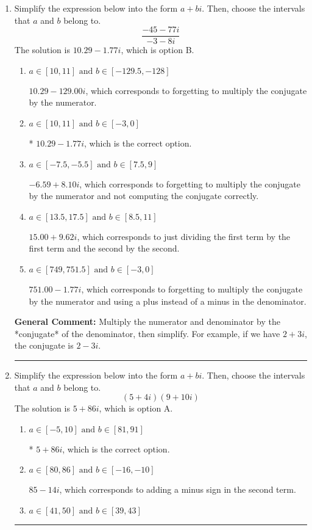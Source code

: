 \documentclass{extbook}[14pt]
\newcommand{\litem}[1]{\item #1

\rule{\textwidth}{0.4pt}}
\begin{document}
\begin{enumerate}
{ Irrational numbers are more than just square root of 3: adding or subtracting values from square root of 3 is also irrational.
}
\litem{
Simplify the expression below into the form $a+bi$. Then, choose the intervals that $a$ and $b$ belong to.
\[ \frac{-45 - 77 i}{-3 - 8 i} \]
The solution is \( 10.29  - 1.77 i \), which is option B.\begin{enumerate}[label=\Alph*.]
\item \( a \in [10, 11] \text{ and } b \in [-129.5, -128] \)

 $10.29  - 129.00 i$, which corresponds to forgetting to multiply the conjugate by the numerator.
\item \( a \in [10, 11] \text{ and } b \in [-3, 0] \)

* $10.29  - 1.77 i$, which is the correct option.
\item \( a \in [-7.5, -5.5] \text{ and } b \in [7.5, 9] \)

 $-6.59  + 8.10 i$, which corresponds to forgetting to multiply the conjugate by the numerator and not computing the conjugate correctly.
\item \( a \in [13.5, 17.5] \text{ and } b \in [8.5, 11] \)

 $15.00  + 9.62 i$, which corresponds to just dividing the first term by the first term and the second by the second.
\item \( a \in [749, 751.5] \text{ and } b \in [-3, 0] \)

 $751.00  - 1.77 i$, which corresponds to forgetting to multiply the conjugate by the numerator and using a plus instead of a minus in the denominator.
\end{enumerate}

\textbf{General Comment:} Multiply the numerator and denominator by the *conjugate* of the denominator, then simplify. For example, if we have $2+3i$, the conjugate is $2-3i$.
}
\litem{
Simplify the expression below into the form $a+bi$. Then, choose the intervals that $a$ and $b$ belong to.
\[ (5 + 4 i)(9 + 10 i) \]
The solution is \( 5 + 86 i \), which is option A.\begin{enumerate}[label=\Alph*.]
\item \( a \in [-5, 10] \text{ and } b \in [81, 91] \)

* $5 + 86 i$, which is the correct option.
\item \( a \in [80, 86] \text{ and } b \in [-16, -10] \)

 $85 - 14 i$, which corresponds to adding a minus sign in the second term.
\item \( a \in [41, 50] \text{ and } b \in [39, 43] \)


\end{enumerate}}
\end{enumerate}
\end{document}
